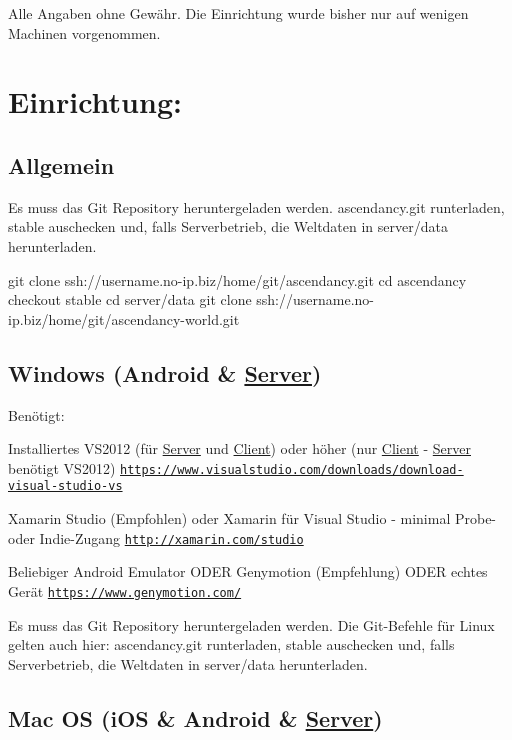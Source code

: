 Alle Angaben ohne Gewähr. Die Einrichtung wurde bisher nur auf wenigen Machinen vorgenommen.

\section*{Einrichtung\-:}

\subsection*{Allgemein}

Es muss das Git Repository heruntergeladen werden. ascendancy.\-git runterladen, stable auschecken und, falls Serverbetrieb, die Weltdaten in server/data herunterladen.

git clone ssh\-://username.no-\/ip.\-biz/home/git/ascendancy.git cd ascendancy checkout stable cd server/data git clone ssh\-://username.no-\/ip.\-biz/home/git/ascendancy-\/world.git

\subsection*{Windows (Android \& \hyperlink{namespaceServer}{Server})}

Benötigt\-:
\begin{DoxyItemize}
\item Installiertes V\-S2012 (für \hyperlink{namespaceServer}{Server} und \hyperlink{namespaceClient}{Client}) oder höher (nur \hyperlink{namespaceClient}{Client} -\/ \hyperlink{namespaceServer}{Server} benötigt V\-S2012) \href{https://www.visualstudio.com/downloads/download-visual-studio-vs}{\tt https\-://www.\-visualstudio.\-com/downloads/download-\/visual-\/studio-\/vs}
\item Xamarin Studio (Empfohlen) oder Xamarin für Visual Studio -\/ minimal Probe-\/ oder Indie-\/\-Zugang \href{http://xamarin.com/studio}{\tt http\-://xamarin.\-com/studio}
\item Beliebiger Android Emulator O\-D\-E\-R Genymotion (Empfehlung) O\-D\-E\-R echtes Gerät \href{https://www.genymotion.com/}{\tt https\-://www.\-genymotion.\-com/}
\end{DoxyItemize}

Es muss das Git Repository heruntergeladen werden. Die Git-\/\-Befehle für Linux gelten auch hier\-: ascendancy.\-git runterladen, stable auschecken und, falls Serverbetrieb, die Weltdaten in server/data herunterladen.

\subsection*{Mac O\-S (i\-O\-S \& Android \& \hyperlink{namespaceServer}{Server})}

